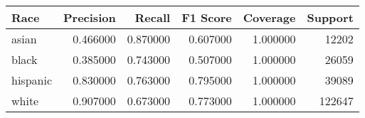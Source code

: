 \begin{tabular}{lrrrrr}
\toprule
Race & Precision & Recall & F1 Score & Coverage & Support \\
\midrule
asian & 0.466000 & 0.870000 & 0.607000 & 1.000000 & 12202 \\
black & 0.385000 & 0.743000 & 0.507000 & 1.000000 & 26059 \\
hispanic & 0.830000 & 0.763000 & 0.795000 & 1.000000 & 39089 \\
white & 0.907000 & 0.673000 & 0.773000 & 1.000000 & 122647 \\
\bottomrule
\end{tabular}
